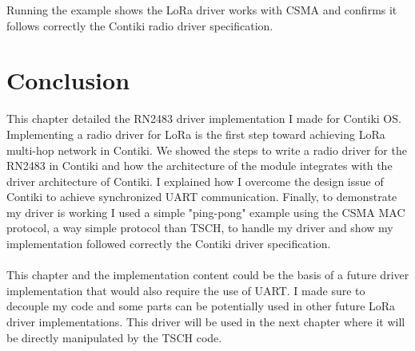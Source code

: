 

Running the example shows the LoRa driver works with CSMA and confirms
it follows correctly the Contiki radio driver specification.

\section{Conclusion}

This chapter detailed the RN2483 driver implementation I made for Contiki OS.
Implementing a radio driver for LoRa is the first step toward achieving LoRa
multi-hop network in Contiki.
We showed the steps to write a radio driver for the RN2483 in Contiki and how
the architecture of the module integrates with the driver architecture of Contiki.
I explained how I overcome the design issue of Contiki to achieve
synchronized UART communication.
Finally, to demonstrate my driver is working I used a simple "ping-pong" example
using the CSMA MAC protocol, a way simple protocol than TSCH, to handle my
driver and show my implementation followed correctly the Contiki driver
specification.

\paragraph{}

This chapter and the implementation content could be the basis of a future
driver implementation that would also require the use of UART.
I made sure to decouple my code and some parts can be potentially used in
other future LoRa driver implementations.
This driver will be used in the next chapter where it will be directly
manipulated by the TSCH code.
